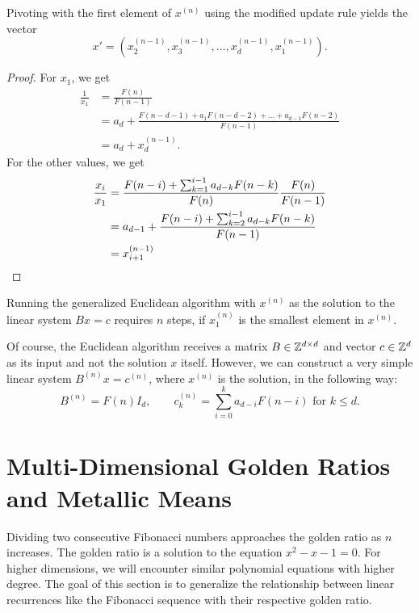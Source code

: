 \begin{lemma}
  Pivoting with the first element of $x^{(n)}$ using the modified update rule yields the vector
  \[
    x' = (x^{(n-1)}_2, x^{(n-1)}_3, \dots, x^{(n-1)}_d, x^{(n-1)}_1).
  \]
\end{lemma}

\begin{proof}
  For $x_1$, we get
  \[
    \begin{aligned}
      \frac{1}{x_1}
      & = \frac{F(n)}{F(n - 1)} \\
      & = a_d + \frac{F(n - d - 1) + a_1 F(n - d - 2) + \dots + a_{d-1} F(n - 2)}{F(n - 1)} \\
      & = a_d + x^{(n-1)}_d.
    \end{aligned}
  \]
  For the other values, we get
  \begin{align*}
    \frac{x_i}{x_1}
    & = \frac{F(n - i) + \sum_{k=1}^{i-1} a_{d-k} F(n - k)}{F(n)} \frac{F(n)}{F(n - 1)} \\
    & = a_{d-1} + \frac{F(n - i) + \sum_{k=2}^{i-1} a_{d-k} F(n - k)}{F(n-1)} \\
    & = x^{(n-1)}_{i+1} \qedhere
  \end{align*}
\end{proof}

\begin{corollary}
  Running the generalized Euclidean algorithm with $x^{(n)}$ as the solution to
  the linear system $B x = c$ requires $n$ steps, if $x^{(n)}_1$ is the
  smallest element in $x^{(n)}$.
\end{corollary}

Of course, the Euclidean algorithm receives a matrix $B \in {\mathbb Z}^{d \times d}$
and vector $c \in {\mathbb Z}^d$ as its input and not the solution $x$ itself.
However, we can construct a very simple linear system $B^{(n)} x = c^{(n)}$,
where $x^{(n)}$ is the solution, in the following way:
\[
  B^{(n)} = F(n) I_d, \qquad c^{(n)}_k = \sum_{i=0}^k a_{d-i} F(n - i) \text{ for } k ≤ d.
\]

\section{Multi-Dimensional Golden Ratios and Metallic Means}

Dividing two consecutive Fibonacci numbers approaches the golden ratio as $n$ increases.
The golden ratio is a solution to the equation $x^2 - x - 1 = 0$.
For higher dimensions, we will encounter similar polynomial equations with higher degree.
The goal of this section is to generalize the relationship between linear
recurrences like the Fibonacci sequence with their respective golden ratio.

